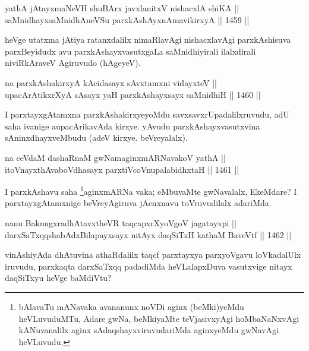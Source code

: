 
\begin{shl}
yathA jAtayxmaNeVH shuBArx javxlanitxV nishacxlA shiKA || \\
saMnidhayxsaMnidhAneVSu parxkAshAyxnAmavikirxyA ||  1459 ||  
\end{shl}

\begin{artha}
heVge utatxma jAtiya ratanxdalilx nimaRlavAgi nishacxlavAgi parxkAshisuva parxBeyidudx avu parxkAshayxvasutxgaLa saMnidhiyirali ilalxdirali niviRkAraveV Agiruvudo (hAgeyeV).	
\end{artha}

\begin{shl}
na parxkAshakirxyA kAcidasayx sAvxtamxni vidayxteV || \\
upacArAtikxrXyA sA\s sayx yaH parxkAshayxsayx saMnidhiH ||  1460 ||  
\end{shl}

\begin{artha}
I parxtayxgAtamxna parxkAshakirxyeyoMdu savxsavxrUpadalilxruvudu, adU saha ivanige aupacArikavAda kirxye. yAvudu parxkAshayxvasutxvina sAninxdhayxveMbudu (adeV kirxye. beVreyalalx).
\end{artha}

\begin{shl}
na ceVdaM dashaRnaM gwNamaginxmARNavakoV yathA || \\
itoV\s nayxthA\s vaboVdhasayx parxtiVcoV\s nupalabidhxtaH ||  1461 ||  
\end{shl}

\begin{artha}
I parxkAshavu saha \footnote{bAlavaTu mANavaka avananunx noVDi aginx (beMki)yeMdu heVLuvuduMTu, Adare gwNa, beMkiyaMte teVjasivxyAgi hoMbaNaNxvAgi kANuvanalilx aginx sAdaqshayxviruvudariMda aginxyeMdu gwNavAgi heVLuvudu.}aginxmARNa vaka; eMbuvaMte gwNavalalx, EkeMdare? I parxtayxgAtamxnige beVreyAgiruva jAcnxnavu toVruvudilalx adariMda.
\end{artha}


\begin{shl}
nanu BaknugxradhAtavxtheVR taqcapxrXyoVgoV jagatayxpi || \\
darxSaTxqqshabAdxBilapayxsayx nitAyx daqSiTxH kathaM BaveVtf ||  1462 ||  
\end{shl}

\begin{artha}
vinAshiyAda dhAtuvina athaRdalilx taqcf parxtayxya parxyoVgavu loVkadalUlx iruvudu, parxkaqta darxSaTxqq padadiMda heVLalapxDuva vasutxvige nitayx daqSiTxyu heVge baMdiVtu?
\end{artha}


